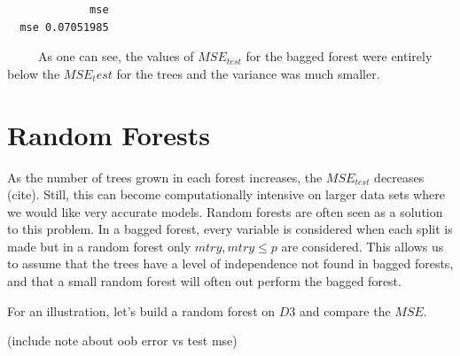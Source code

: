 \documentclass[12pt,twoside]{reedthesis}
\begin{document}
  \begin{verbatim}
             mse
  mse 0.07051985
  \end{verbatim}
  
  ~~~~~As one can see, the values of \(MSE_{test}\) for the bagged forest
  were entirely below the \(MSE_test\) for the trees and the variance was
  much smaller.
  
  \section{Random Forests}\label{random-forests}
  
  As the number of trees grown in each forest increases, the
  \(MSE_{test}\) decreases (cite). Still, this can become computationally
  intensive on larger data sets where we would like very accurate models.
  Random forests are often seen as a solution to this problem. In a bagged
  forest, every variable is considered when each split is made but in a
  random forest only \(mtry, mtry \leq p\) are considered. This allows us
  to assume that the trees have a level of independence not found in
  bagged forests, and that a small random forest will often out perform
  the bagged forest.
  
  For an illustration, let's build a random forest on \(D3\) and compare
  the \(MSE\).
  
  (include note about oob error vs test mse)
  
  \begin{Shaded}
  \begin{Highlighting}[]
  \StringTok{ }\NormalTok{(}\NormalTok{,}\NormalTok{)}
  \StringTok{ }\NormalTok{(}\NormalTok{,}\NormalTok{)}
  \NormalTok{:}\NormalTok{)\{}
    \StringTok{ }   \NormalTok{)}
    \StringTok{ }\StringTok{ }\NormalTok{)}
  \NormalTok{\}}
  
  \StringTok{ }
  
  \NormalTok{(}\NormalTok{(}  \StringTok{ }\NormalTok{()}
  \end{Highlighting}
  \end{Shaded}
  
\end{document}
